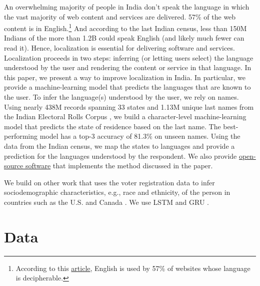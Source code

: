 \documentclass[11pt,  letterpaper]{article}
\begin{document}
An overwhelming majority of people in India don’t speak the language in which the vast majority of web content and services are delivered. 57\% of the web content is in English.\footnote{According to this \href{https://w3techs.com/technologies/overview/content_language}{article}, English is used by 57\% of websites whose language is decipherable.} And according to the last Indian census, less than 150M Indians of the more than 1.2B could speak English (and likely much fewer can read it). Hence, localization is essential for delivering software and services. Localization proceeds in two steps: inferring (or letting users select) the language understood by the user and rendering the content or service in that language. In this paper, we present a way to improve localization in India. In particular, we provide a machine-learning model that predicts the languages that are known to the user. To infer the language(s) understood by the user, we rely on names. Using nearly 438M records spanning 33 states and 1.13M unique last names from the Indian Electoral Rolls Corpus \citep{DVN/OG47IV_2023}, we build a character-level machine-learning model that predicts the state of residence based on the last name. The best-performing model has a top-3 accuracy of 81.3\%  on unseen names. Using the data from the Indian census, we map the states to languages and provide a prediction for the languages understood by the respondent. We also provide \href{https://github.com/in-rolls/instate}{open-source software} that implements the method discussed in the paper. 

We build on other work that uses the voter registration data to infer sociodemographic characteristics, e.g., race and ethnicity, of the person in countries such as the U.S. and Canada \citep{imai2016improving, sood2018predicting, parasurama2021racebert, wong2020machine}. We use LSTM \citep{hochreiter1997long} and GRU \citep{cho2014properties}.


\section{Data}
\end{document}
